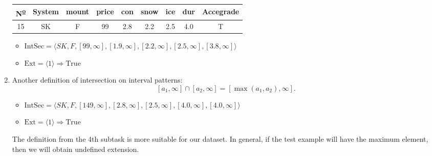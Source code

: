 \documentclass[12pt]{report}
\begin{document}
\begin{solution}
\begin{enumerate}
          \begin{table}[H]
            \centering
            \begin{tabular}{|c|c|c|c|c|c|c|c|c|}
            \hline
            N\textsuperscript{\underline{o}} & System & mount & price & con & snow & ice & dur & Accegrade \\ \hline
            15 & SK     & F     & 99    & 2.8 & 2.2  & 2.5 & 4.0 & T         \\ \hline
            \end{tabular}
            \end{table}
            \begin{itemize}
              \item $\text{IntSec} = \langle SK, F, [ 99, \infty], [1.9, \infty], [2.2, \infty], [2.5, \infty], [3.8, \infty] \rangle$
              \item $\text{Ext} = \langle 1 \rangle \Longrightarrow \text{True}$
            \end{itemize} 
        \item Another definition of intersection on interval patterns:
        \[[a_1, \infty] \cap [a_2, \infty] = [\max (a_1, a_2), \infty].\]
        \begin{itemize}
          \item $\text{IntSec} = \langle SK, F, [ 149, \infty], [2.8, \infty], [2.5, \infty], [4.0, \infty], [4.0, \infty] \rangle$
          \item $\text{Ext} = \langle 1 \rangle \Longrightarrow \text{True}$
        \end{itemize}
        The definition from the 4th subtask is more suitable for our dataset. In general, if the test example will have the maximum element, then we will obtain undefined extension.
    \end{enumerate}
\end{solution}
\end{document}
